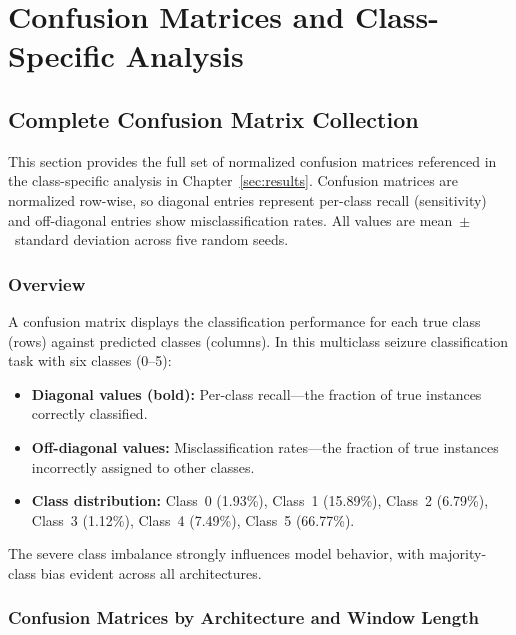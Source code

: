 \cleardoubleoddpage%
\chapter{Confusion Matrices and Class-Specific Analysis}
\label{app:confusion_matrices}

\section{Complete Confusion Matrix Collection}
\label{app:complete_confusion_matrices}

This section provides the full set of normalized confusion matrices referenced in the class-specific analysis in Chapter~\ref{sec:results}. Confusion matrices are normalized row-wise, so diagonal entries represent per-class recall (sensitivity) and off-diagonal entries show misclassification rates. All values are mean~$\pm$~standard deviation across five random seeds.

\subsection{Overview}

A confusion matrix displays the classification performance for each true class (rows) against predicted classes (columns). In this multiclass seizure classification task with six classes (0--5):
\begin{itemize}
\item \textbf{Diagonal values (bold):} Per-class recall---the fraction of true instances correctly classified.
\item \textbf{Off-diagonal values:} Misclassification rates---the fraction of true instances incorrectly assigned to other classes.
\item \textbf{Class distribution:} Class~0 (1.93\%), Class~1 (15.89\%), Class~2 (6.79\%), Class~3 (1.12\%), Class~4 (7.49\%), Class~5 (66.77\%).
\end{itemize}

The severe class imbalance strongly influences model behavior, with majority-class bias evident across all architectures.

\subsection{Confusion Matrices by Architecture and Window Length}
\label{app:confusion_matrices_by_config}

